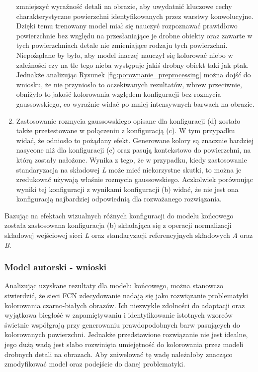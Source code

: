 \begin{enumerate}[label=(\alph*)]
    zmniejszyć wyraźność detali na obrazie, aby uwydatnić kluczowe cechy charakterystyczne
    powierzchni identyfikowanych przez warstwy konwolucyjne. Dzięki temu trenowany
    model miał się nauczyć rozpoznawać prawidłowo powierzchnie bez względu na
    przesłaniające je drobne obiekty oraz zawarte w tych powierzchniach detale
    nie zmieniające rodzaju tych powierzchni. Niepożądane by było,
    aby model inaczej nauczył się kolorować niebo w zależności czy na tle tego
    nieba występuje jakiś drobny obiekt taki jak ptak. Jednakże analizując
    Rysunek \ref{fig:porownanie_preprocessing} można dojść do wniosku, że nie
    przyniosło to oczekiwanych rezultatów, wbrew przeciwnie, obniżyło to jakość
    kolorowania względem konfiguracji bez rozmycia gaussowskiego, co wyraźnie
    widać po mniej intensywnych barwach na obrazie.
    \item Zastosowanie rozmycia gaussowskiego opisane dla konfiguracji (d)
    zostało także przetestowane w połączeniu z konfiguracją (c). W tym
    przypadku widać, że odniosło to pożądany efekt. Generowane kolory są znacznie
    bardziej nasycone niż dla konfiguracji (c) oraz pasują kontekstowo do
    powierzchni, na którą zostały nałożone. Wynika z tego, że w przypadku, kiedy zastosowanie
    standaryzacja na składowej \textit{L} może mieć niekorzystne skutki, to
    można je zredukować używają właśnie rozmycia gaussowskiego. Aczkolwiek
    porównując wyniki tej konfiguracji z wynikami konfiguracji (b) widać, że
    nie jest ona konfiguracją najbardziej odpowiednią dla rozważanego
    rozwiązania.
  \end{enumerate}

  \noindent
  Bazując na efektach wizualnych różnych konfiguracji do modelu końcowego
  została zastosowana konfiguracja (b) składająca się z operacji
  normalizacji składowej wejściowej sieci \textit{L} oraz standaryzacji
  referencyjnych składowych \textit{A} oraz \textit{B}.

  \subsubsection{Model autorski - wnioski}

  Analizując uzyskane rezultaty dla modelu końcowego, można stanowczo
  stwierdzić, że sieci FCN zdecydowanie nadają się jako rozwiązanie problematyki kolorowania
  czarno-białych obrazów. Ich niezwykłe zdolności do adaptacji oraz wyjątkowa
  biegłość w zapamiętywaniu i identyfikowanie istotnych wzorców świetnie współgrają
  przy generowaniu prawdopodobnych barw pasujących do kolorowanych powierzchni.
  Jednakże przedstawione rozwiązanie nie jest idealne, jego dużą wadą jest
  słabo rozwinięta umiejętność do kolorowania przez modeli drobnych detali na obrazach.
  Aby zniwelować tę wadę należałoby znacząco zmodyfikować model oraz podejście do
  danej problematyki.

